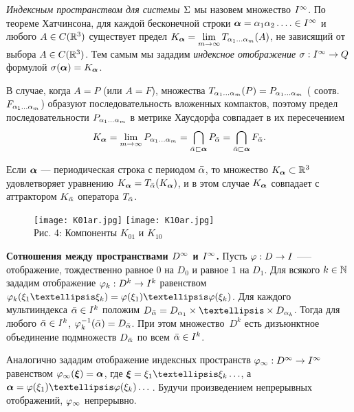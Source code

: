 {\em Индексным пространством для системы $\Sigma$} мы назовем множество $I^\infty$. По теореме Хатчинсона,
для каждой бесконечной строки  ${\bm{\alpha}}=\alpha_1\alpha_2\ldots.\in I^\infty$  и любого $A\in C(\mathbb{R}^3)$ существует предел $K_{\bm{\alpha}}=\lim\limits_{m\to\infty}T_{\alpha_1\ldots\alpha_m}(A)$, не зависящий от выбора   $A\in C(\mathbb{R}^3)$. Тем самым  мы зададим {\em индексное отображение} $\sigma:I^\infty\to Q$ формулой $\sigma({\bm{\alpha}})=K_{\bm{\alpha}}$.

 В случае, когда $A=P$ (или $A=F$),
множества $T_{\alpha_1\ldots\alpha_m}(P)=P_{\alpha_1\ldots\alpha_m}$ ( соотв.$F_{\alpha_1\ldots\alpha_m}$)  образуют последовательность вложенных компактов, поэтому предел последовательности $P_{\alpha_1\ldots\alpha_m}$ в метрике Хаусдорфа совпадает в их пересечением
\begin{equation}\label{sigma} 
K_{\bm{\alpha}}=\lim\limits_{m\to\infty}P_{\alpha_1\ldots\alpha_m}=\bigcap\limits_{{\bar{\alpha}}\sqsubset {\bm{\alpha}}}P_{\bar{\alpha}}=\bigcap\limits_{{\bar{\alpha}}\sqsubset {\bm{\alpha}}}F_{\bar{\alpha}}.
\end{equation}

Если ${\bm{\alpha}}$ --- периодическая строка с периодом $\bar{\alpha}$, то множество $K_{\bm{\alpha}}\subset \mathbb{R}^3$ удовлетворяет уравнению $K_{\bm{\alpha}}=T_{\bar{\alpha}}(K_{\bm{\alpha}})$, и  в этом случае $K_{\bm{\alpha}}$ совпадает с аттрактором  $K_{\bar{\alpha}}$ оператора  $T_{\bar{\alpha}}$.


\begin{figure}[b!]
\begin{center}
\qquad\qquad
\texttt{[image: K01ar.jpg]}
\hfill
\texttt{[image: K10ar.jpg]}\qquad\qquad\\
[1ex]
{\footnotesize Рис. 4: Компоненты $K_{01}$ и $K_{10}$}
\end{center}\end{figure}


{\bf Сотношения между пространствами $D^\infty$ и $I^\infty$.} Пусть $\varphi:D\to I$  —--  отображение, тождественно равное $0$ на   $D_0$ и равное $1$ на $D_1$. Для всякого $k\in\mathbb{N}$
зададим отображение $\varphi_k:D^k\to I^k$ равенством $\fy_k(\xi_1…\xi_k)=\fy(\xi_1)…\fy(\xi_k)$.
Для каждого мультииндекса  ${\bar{\alpha}}\in I^k$ положим $D_\bal=D_{\al_1}\times…\times D_{\al_k}$. Тогда для любого ${\bar{\alpha}}\in I^k$, $ \varphi_k^{-1}({\bar{\alpha}})=D_{\bar{\alpha}}$.
При этом множество~$D^k$ есть дизъюнктное объединение подмножеств $D_{\bar{\alpha}}$ по всем ${\bar{\alpha}}\in I^k$.

Аналогично зададим отображение индексных пространств $\varphi_\infty: D^\infty\to I^\infty$
 равенством $\varphi_\infty({\bm{\xi}})={\bm{\alpha}}$, где  $\bmx=\xi_1…\xi_k\ldots$, а  $\bma=\fy(\xi_1)…\fy(\xi_k)\ldots$\,. Будучи произведением непрерывных отображений, $\varphi_\infty$ непрерывно.

